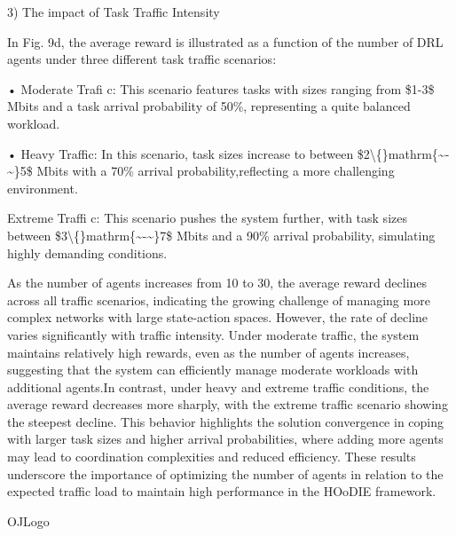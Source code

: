 \documentclass{article}
\begin{document}
3) The impact of Task Traffic Intensity

In Fig. 9d, the average reward is illustrated as a function of the number of DRL agents under three different task traffic scenarios:

• Moderate Trafi c: This scenario features tasks with sizes ranging from \$1-3\$ Mbits and a task arrival probability of 50\%, representing a quite balanced workload.

• Heavy Traffic: In this scenario, task sizes increase to between \$2\textbackslash\{\}mathrm\{\textasciitilde{}-\textasciitilde{}\}5\$ Mbits with a 70\% arrival probability,reflecting a more challenging environment.

Extreme Traffi c: This scenario pushes the system further, with task sizes between \$3\textbackslash\{\}mathrm\{\textasciitilde{}-\textasciitilde{}\}7\$ Mbits and a 90\% arrival probability, simulating highly demanding conditions.

As the number of agents increases from 10 to 30, the average reward declines across all traffic scenarios, indicating the growing challenge of managing more complex networks with large state-action spaces. However, the rate of decline varies significantly with traffic intensity. Under moderate traffic, the system maintains relatively high rewards, even as the number of agents increases, suggesting that the system can efficiently manage moderate workloads with additional agents.In contrast, under heavy and extreme traffic conditions, the average reward decreases more sharply, with the extreme traffic scenario showing the steepest decline. This behavior highlights the solution convergence in coping with larger task sizes and higher arrival probabilities, where adding more agents may lead to coordination complexities and reduced efficiency. These results underscore the importance of optimizing the number of agents in relation to the expected traffic load to maintain high performance in the HOoDIE framework.

OJLogo
\end{document}
